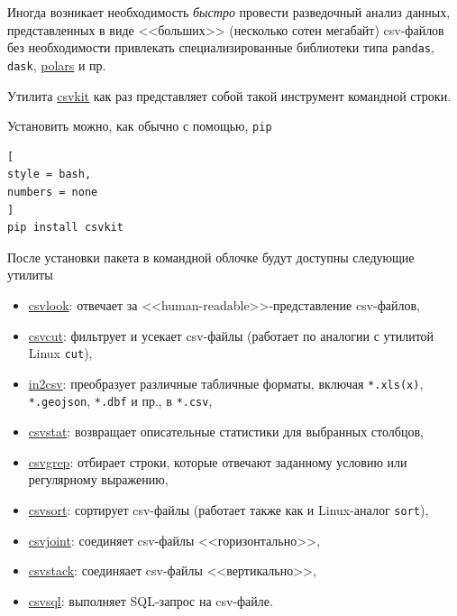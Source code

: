 \documentclass[%
	11pt,
	a4paper,
	utf8,
		]{article}
\begin{document}
Иногда возникает необходимость \emph{быстро} провести разведочный анализ данных, представленных в виде <<больших>> (несколько сотен мегабайт) csv-файлов без необходимости привлекать специализированные библиотеки типа \texttt{pandas}, \texttt{dask}, \href{https://github.com/pola-rs/polars}{\ttfamily polars} и пр.

Утилита \href{https://github.com/wireservice/csvkit}{\ttfamily csvkit} как раз представляет собой такой инструмент командной строки.

Установить можно, как обычно с помощью, \texttt{pip}
\begin{lstlisting}[
style = bash,
numbers = none	
]
pip install csvkit
\end{lstlisting}

После установки пакета в командной облочке будут доступны следующие утилиты
\begin{itemize}
	\item \href{https://csvkit.readthedocs.io/en/latest/scripts/csvlook.html}{\ttfamily csvlook}: отвечает за <<human-readable>>-представление csv-файлов,
	
	\item \href{https://csvkit.readthedocs.io/en/latest/scripts/csvcut.html}{\ttfamily csvcut}: фильтрует и усекает csv-файлы (работает по аналогии с утилитой Linux \texttt{cut}),
	
	\item \href{https://csvkit.readthedocs.io/en/latest/scripts/in2csv.html}{\ttfamily in2csv}: преобразует различные табличные форматы, включая \texttt{*.xls(x)}, \texttt{*.geojson}, \texttt{*.dbf} и пр., в \texttt{*.csv},
	
	\item \href{https://csvkit.readthedocs.io/en/latest/scripts/csvstat.html}{\ttfamily csvstat}: возвращает описательные статистики для выбранных столбцов, 
	
	\item \href{https://csvkit.readthedocs.io/en/latest/scripts/csvgrep.html}{\ttfamily csvgrep}: отбирает строки, которые отвечают заданному условию или регулярному выражению,
	
	\item \href{https://csvkit.readthedocs.io/en/latest/scripts/csvsort.html}{\ttfamily csvsort}: сортирует csv-файлы (работает также как и Linux-аналог \texttt{sort}),
	
	\item \href{https://csvkit.readthedocs.io/en/latest/scripts/csvjoin.html}{\ttfamily csvjoint}: соединяет csv-файлы <<горизонтально>>,
	
	\item \href{https://csvkit.readthedocs.io/en/latest/scripts/csvstack.html}{\ttfamily csvstack}: соединяает csv-файлы <<вертикально>>,
	
	\item \href{https://csvkit.readthedocs.io/en/latest/scripts/csvsql.html}{\ttfamily csvsql}: выполняет SQL-запрос на csv-файле.
\end{itemize}
\end{document}
